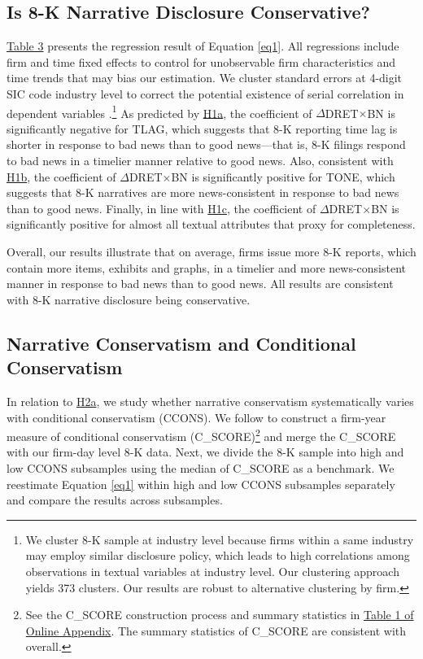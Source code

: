\documentclass[letterpaper,12pt]{article}
\begin{document}
\begin{spacing}{1.5}
\subsection{Is 8-K Narrative Disclosure Conservative?}
\noindent \hyperref[T3]{Table 3} presents the regression result of Equation \eqref{eq1}. All regressions include firm and time fixed effects to control for unobservable firm characteristics and time trends that may bias our estimation. We cluster standard errors at 4-digit SIC code industry level to correct the potential existence of serial correlation in dependent variables \cite{petersenEstimatingStandardErrors2009}.\footnote{We cluster 8-K sample at industry level because firms within a same industry may employ similar disclosure policy, which leads to high correlations among observations in textual variables at industry level. Our clustering approach yields 373 clusters. Our results are robust to alternative clustering by firm. } As predicted by \hyperref[hyp:h1a]{H1a}, the coefficient of $\Delta$DRET$\times$BN is significantly negative for TLAG,
which suggests that 8-K reporting time lag is shorter in response to bad news than to good news---that is, 8-K filings respond to bad news in a timelier manner relative to good news. Also, consistent with \hyperref[hyp:h1b]{H1b}, the coefficient of $\Delta$DRET$\times$BN is significantly positive for TONE, which suggests that 8-K narratives are more news-consistent in response to bad news than to good news. Finally, in line with \hyperref[hyp:h1c]{H1c}, the coefficient of $\Delta$DRET$\times$BN is significantly positive for almost all textual attributes that proxy for completeness.

Overall, our results illustrate that on average, firms issue more 8-K reports, which contain more items, exhibits and graphs, in a timelier and more news-consistent manner in response to bad news than to good news. All results are consistent with 8-K narrative disclosure being conservative.

\subsection{Narrative Conservatism and Conditional Conservatism}
\noindent In relation to \hyperref[hyp:h2a]{H2a}, we study whether narrative conservatism systematically varies with conditional conservatism (CCONS). 
We follow  to construct a firm-year measure of conditional conservatism (C\_SCORE)\footnote{See the C\_SCORE construction process and summary statistics in \hyperref[OAT1]{Table 1 of Online Appendix}. The summary statistics of C\_SCORE are consistent with  overall. } and merge the C\_SCORE with our firm-day level 8-K data. Next, we divide the 8-K sample into high and low CCONS subsamples using the median of C\_SCORE as a benchmark. We reestimate Equation \eqref{eq1} within high and low CCONS subsamples separately and compare the results across subsamples.


\end{spacing}
\end{document}
